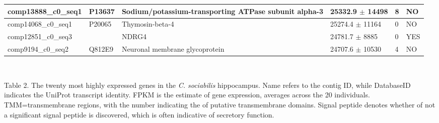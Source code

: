 \documentclass[10.5pt]{article}
\begin{document}
\begin{center}
\begin{tabular}{ | p{3.4cm} | p{2.1cm} | p{4cm}  | p{2cm} | p{1.3cm} | p{1.8cm} |}
comp13888\_c0\_seq1 	&	 P13637 	&	 Sodium/potassium-transporting ATPase subunit alpha-3 	&	25332.9	$\pm$	14498	&	8	&	NO	\\ \hline
comp14068\_c0\_seq1 	&	 P20065 	&	 Thymosin-beta-4	&	25274.4	$\pm$	11164	&	0	&	NO	\\ \hline
comp12851\_c0\_seq3 	&		&	 NDRG4 	&	24781.7	$\pm$	8885	&	0	&	YES	\\ \hline
comp9194\_c0\_seq2 	&	 Q812E9 	&	 Neuronal membrane glycoprotein 	&	24707.6	$\pm$	10530	&	4	&	NO	\\ \hline
 \end{tabular}
\\
\end{center}

\vspace{10mm}
\noindent
Table 2. The twenty most highly expressed genes in the \textit{C. sociabilis} hippocampus. Name refers to the contig ID, while DatabaseID indicates the UniProt transcript identity. FPKM is the estimate of gene expression, averages across the 20 individuals. TMM=transmembrane regions, with the number indicating the of putative transmembrane domains. Signal peptide denotes whether of not a significant signal peptide is discovered, which is often indicative of secretory function.   
\end{document}

